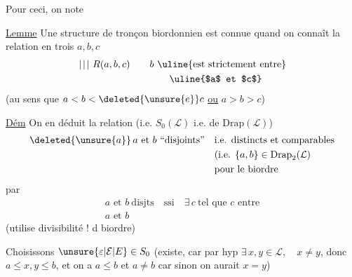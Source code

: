 Pour ceci, on note 

\uline{Lemme} Une structure de  tronçon biordonnien est connue quand on connaît la relation en  trois  $a,b,c$
\[
\begin{aligned}
\left.\vphantom{\substack{X\\X}}\right|\!\left.\vphantom{\substack{X\\X}}\right|\!\left.\vphantom{\substack{X\\X}}\right|\, R(a,b,c)
&\qquad b\ \text{\uline{est strictement entre}}\\
&\qquad\qquad\text{\uline{$a$ et $c$}}
\end{aligned}
\]
(au sens que $a<b<\deleted{\unsure{e}}c$ \uline{ou} $a>b>c$)

\uline{Dém}  On en déduit la relation (i.e.  $S_0(\mathcal L)$\deleted{\unsure{)}} i.e. de $\mathrm{Drap}(\mathcal L)$)
\[
\begin{aligned}
\deleted{\unsure{a}}\,a\text{ et }b\ \text{``disjoints''}\quad&
\text{i.e. distincts et comparables}\\
&\text{(i.e. }\{a,b\}\in\mathrm{Drap}_2(\mathcal L)\\
&\text{pour le biordre}
\end{aligned}
\]
par 
\[
\begin{aligned}
a\text{ et }b\ \text{disjts}\quad \text{ssi}\quad
\exists\,c\ \text{tel que }c\text{ entre}\\
a\text{ et }b
\end{aligned}
\]
(utilise divisibilité ! d  biordre)

 Choisissons $\unsure{\varepsilon|\mathcal E|E}\in S_0$ (existe, car  par hyp $\exists\,x,y\in\mathcal L,\quad x\ne y$, donc $a\leq x,y\leq b$, et on a $a\leq b$ et $a\ne b$ \deleted{\unsure{)}} car sinon on aurait $x=y$)

